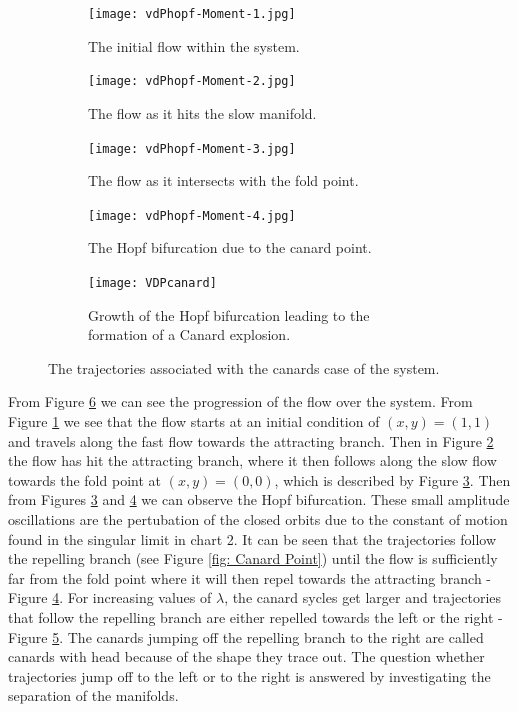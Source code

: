 \begin{figure}[h!]
	\centering
	\begin{subfigure}[t]{0.45\textwidth}
		\centering
		\texttt{[image: vdPhopf-Moment-1.jpg]}
		\caption{The initial flow within the system.} \label{fig:timing1}
	\end{subfigure}
	\hfill
	\begin{subfigure}[t]{0.45\textwidth}
		\centering
		\texttt{[image: vdPhopf-Moment-2.jpg]}
		\caption{The flow as it hits the slow manifold.} \label{fig:timing2}
	\end{subfigure}
	
	\vspace{1cm}
	\begin{subfigure}[t]{0.45\textwidth}
		\centering
		\texttt{[image: vdPhopf-Moment-3.jpg]}
		\caption{The flow as it intersects with the fold point.} \label{fig:timing3}
	\end{subfigure}
	\hfill
	\begin{subfigure}[t]{0.45\textwidth}\centering
		\texttt{[image: vdPhopf-Moment-4.jpg]}
		\caption{The Hopf bifurcation due to the canard point.}\label{fig:timing4}
	\end{subfigure}\vspace{1cm}
	\begin{subfigure}[t]{0.45\textwidth}\centering
		\texttt{[image: VDPcanard]}
		\caption{Growth of the Hopf bifurcation leading to the formation of a Canard explosion.}
		\label{fig: hopf growth}
	\end{subfigure}
	\caption{The trajectories associated with the canards case of the \vdp system.}
	\label{fig: 4 canard }
\end{figure}\newpage
From Figure \ref{fig: 4 canard } we can see the progression of the flow over the system. From Figure \ref{fig:timing1} we see that the flow starts at an initial condition of $ (x,y)=(1,1) $ and travels along the fast flow towards the attracting branch. Then in Figure \ref{fig:timing2} the flow has hit the attracting branch, where it then follows along the slow flow towards the fold point at $ (x,y)=(0,0) $, which is described by Figure \ref{fig:timing3}. Then from Figures \ref{fig:timing3} and \ref{fig:timing4} we can observe the Hopf bifurcation. These small amplitude oscillations are the pertubation of the closed orbits due to the constant of motion found in the singular limit in chart 2.  It can be seen that the trajectories follow the repelling branch (see Figure \ref{fig: Canard Point}) until the flow is sufficiently far from the fold point where it will then repel towards the attracting branch - Figure \ref{fig:timing4}. For increasing values of $\lambda$, the canard sycles get larger and trajectories that follow the repelling branch are either repelled towards the left or the right - Figure \ref{fig: hopf growth}. The canards jumping off the repelling branch to the right are called canards with head because of the shape they trace out.
The question whether trajectories jump off to the left or to the right is answered by investigating the separation of the manifolds.


